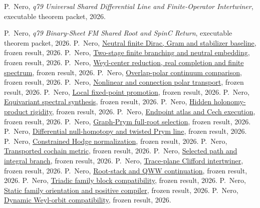 \documentclass[11pt]{article}
\newcommand{\frozenresult}[2]{\href{https://github.com/PeterNero/mtt-results-repro/blob/f141a20ea23c5c3ff19cc2161c0e226e29ade8a7/release/results/#1/artifact.json}{#2}}
\begin{document}
\begin{thebibliography}{99}
P.~Nero,
\emph{q79 Universal Shared Differential Line and Finite-Operator
Intertwiner}, executable theorem packet, 2026.

P.~Nero,
\emph{q79 Binary-Sheet FM Shared Root and SpinC Return}, executable theorem
packet, 2026.
 P.~Nero, \frozenresult{q79_superconnection_a33_01}{Neutral finite Dirac, Gram and stabilizer baseline}, frozen result, 2026.
 P.~Nero, \frozenresult{q79_superconnection_02a_b}{Two-stage finite branching and neutral embedding}, frozen result, 2026.
 P.~Nero, \frozenresult{q79_superconnection_02c1_c5}{Weyl-center reduction, real completion and finite spectrum}, frozen result, 2026.
 P.~Nero, \frozenresult{q79_superconnection_03a}{Overlap-polar continuum comparison}, frozen result, 2026.
 P.~Nero, \frozenresult{q79_superconnection_03b}{Nonlinear and connection polar transport}, frozen result, 2026.
 P.~Nero, \frozenresult{q79_superconnection_03c}{Local fixed-point promotion}, frozen result, 2026.
 P.~Nero, \frozenresult{q79_superconnection_03d}{Equivariant spectral synthesis}, frozen result, 2026.
 P.~Nero, \frozenresult{q79_superconnection_03e}{Hidden holonomy-product rigidity}, frozen result, 2026.
 P.~Nero, \frozenresult{q79_superconnection_03f}{Endpoint atlas and Cech execution}, frozen result, 2026.
 P.~Nero, \frozenresult{q79_superconnection_03g}{Graph-Prym full-root selection}, frozen result, 2026.
 P.~Nero, \frozenresult{q79_superconnection_03h}{Differential null-homotopy and twisted Prym line}, frozen result, 2026.
 P.~Nero, \frozenresult{q79_superconnection_03i}{Constrained Hodge normalization}, frozen result, 2026.
 P.~Nero, \frozenresult{q79_superconnection_03j}{Transported cochain metric}, frozen result, 2026.
 P.~Nero, \frozenresult{q79_superconnection_03k}{Selected path and integral branch}, frozen result, 2026.
 P.~Nero, \frozenresult{q79_superconnection_04a}{Trace-plane Clifford intertwiner}, frozen result, 2026.
 P.~Nero, \frozenresult{q79_superconnection_04b}{Root-stack and QWW continuation}, frozen result, 2026.
 P.~Nero, \frozenresult{q79_superconnection_04c}{Triadic family block compatibility}, frozen result, 2026.
 P.~Nero, \frozenresult{q79_superconnection_04d}{Static family orientation and positive compiler}, frozen result, 2026.
 P.~Nero, \frozenresult{q79_superconnection_04e}{Dynamic Weyl-orbit compatibility}, frozen result, 2026.

\end{thebibliography}
\end{document}
